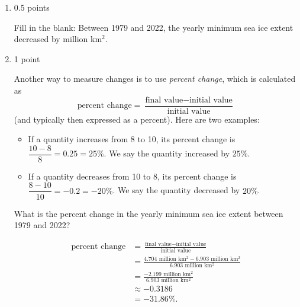 \documentclass{article}
\begin{document}
\begin{enumerate}
  \begin{enumerate}
  \item \label{sea-ice-change}

    \begin{grading}
      0.5 points
    \end{grading}

    \begin{problem}[0.5in]
      Fill in the blank: Between 1979 and 2022, the yearly minimum sea ice extent decreased by  million km$^2$.
    \end{problem}

  \item \label{sea-ice-percent-change}

    \begin{grading}
      1 point
    \end{grading}

    \begin{problem}[\vfill]
      Another way to measure changes is to use \emph{percent change}, which is calculated as
      \[ \text{percent change} = \dfrac{\text{final value} - \text{initial value}}{\text{initial value}}\] (and typically then expressed as a percent). Here are two examples:
      \begin{itemize}
      \item If a quantity increases from 8 to 10, its percent change is $\dfrac{10 - 8}{8} = 0.25 = 25\%$. We say the quantity increased by $25\%$.

      \item If a quantity decreases from 10 to 8, its percent change is $\dfrac{8 - 10}{10} = -0.2 = -20\%$. We say the quantity decreased by $20\%$.
      \end{itemize}

      What is the percent change in the yearly minimum sea ice extent between 1979 and 2022?
    \end{problem}

    \begin{solution}
      \begin{align*}
        \text{percent change} &= \frac{\text{final value} - 
          \text{initial value}}{\text{initial value}} \\
        &= \frac{4.704 \text{ million km$^2$} - 6.903 \text{ million km$^2$}}
          {6.903 \text{ million km$^2$}} \\
        &= \frac{-2.199 \text{ million km$^2$}}{6.903 \text{ million km$^2$}} \\
        &\approx -0.3186 \\
        &= -31.86\%.
      \end{align*}
    \end{solution}


\end{enumerate}
\end{enumerate}
\end{document}
